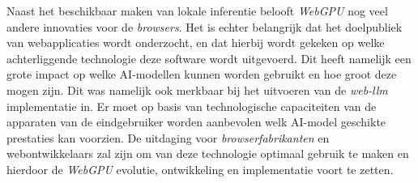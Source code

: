 Naast het beschikbaar maken van lokale inferentie belooft \textit{WebGPU} nog veel andere innovaties voor de \textit{browsers}. Het is echter belangrijk dat het doelpubliek van webapplicaties wordt onderzocht, en dat hierbij wordt gekeken op welke achterliggende technologie deze software wordt uitgevoerd. Dit heeft namelijk een grote impact op welke AI-modellen kunnen worden gebruikt en hoe groot deze mogen zijn. Dit was namelijk ook merkbaar bij het uitvoeren van de \textit{web-llm} implementatie in. Er moet op basis van technologische capaciteiten van de apparaten van de eindgebruiker worden aanbevolen welk AI-model geschikte prestaties kan voorzien. De uitdaging voor \textit{browserfabrikanten} en web\-on\-twi\-kke\-laars zal zijn om van deze technologie optimaal gebruik te maken en hierdoor de \textit{WebGPU} evolutie, ontwikkeling en implementatie voort te zetten.